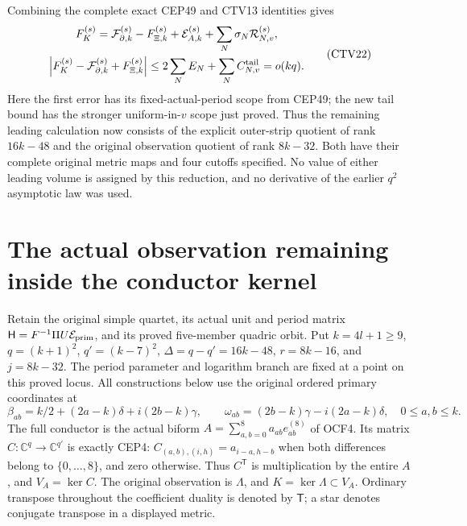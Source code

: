 \documentclass[11pt,a4paper]{article}
\begin{document}
Combining the complete exact CEP49 and CTV13 identities gives
\[
 \begin{gathered}
 F_K^{(s)}
  =\mathcal F_{\partial,k}^{(s)}
       -F_{\Xi,k}^{(s)}
       +\mathcal E_{A,k}^{(s)}
       +\sum_N\sigma_N\mathcal R_{N,v}^{(s)},\\
 \left|F_K^{(s)}-\mathcal F_{\partial,k}^{(s)}
                         +F_{\Xi,k}^{(s)}\right|
 \le2\sum_NE_N+\sum_NC_{N,v}^{\rm tail}=o(kq).
 \end{gathered}\tag{CTV22}
\]
Here the first error has its fixed-actual-period scope from CEP49;
the new tail bound has the stronger uniform-in-$v$ scope just
proved. Thus the remaining leading calculation now consists
of the explicit outer-strip quotient of rank $16k-48$ and the
original observation quotient of rank $8k-32$. Both have their
complete original metric maps and four cutoffs specified.
No value of either leading volume is assigned by this reduction,
and no derivative of the earlier $q^2$ asymptotic law was used.


\clearpage
\section{The actual observation remaining inside the conductor kernel}
\label{sec:ROQ}

Retain the original simple quartet, its actual unit and period matrix
$\mathsf H=F^{-1}\Pi U\mathcal E_{\rm prim}$, and its proved five-member
quadric orbit. Put $k=4l+1\ge9$, $q=(k+1)^2$, $q'=(k-7)^2$,
$\Delta=q-q'=16k-48$, $r=8k-16$, and $j=8k-32$.
The period parameter and logarithm branch are fixed at a point on this
proved locus. All constructions below use the original ordered primary
coordinates at
\[
 \beta_{ab}=k/2+(2a-k)\delta+i(2b-k)\gamma,
 \qquad \omega_{ab}=(2b-k)\gamma-i(2a-k)\delta,
 \quad 0\le a,b\le k.
 \tag{ROQ1}
\]
The full conductor is the actual biform
$A=\sum_{a,b=0}^8a_{ab}e_{ab}^{(8)}$ of OCF4. Its matrix
$C:\mathbb C^q\to\mathbb C^{q'}$ is exactly CEP4:
$C_{(a,b),(i,h)}=a_{i-a,h-b}$ when both differences belong to
$\{0,\ldots,8\}$, and zero otherwise. Thus $C^{\mathsf T}$
is multiplication by the entire $A$, and $V_A=\ker C$.
The original observation is $\Lambda$, and $K=\ker\Lambda\subset V_A$.
Ordinary transpose throughout the coefficient duality is denoted by
$\mathsf T$; a star denotes conjugate transpose in a displayed metric.
\end{document}
